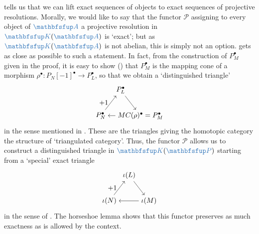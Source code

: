  tells us that we can lift exact sequences of
objects to exact sequences of projective resolutions. Morally, we
would like to say that the functor $\mathscr{P}$ assigning to every
object of $\categ{A}$ a projective resolution in
$\categ{K}(\categ{A})$ is `exact'; but as $\categ{K}(\categ{A})$ is
not abelian, this is simply not an option. 
gets as close as possible to such a statement. In fact, from the
construction of $P_M^\bullet$ given in the proof, it is easy to show
() that
$P_M^\bullet$ is the mapping cone of a morphism
$\rho^\bullet : P_N[-1]^\bullet \to P_L^\bullet$, so that we obtain a
`distinguished triangle'
\[
  \begin{tikzpicture}[baseline=(current bounding box.center)]
    \node (L) at (1,1.3)
    {$P_L^\bullet$}; \node (N) at (0,0)
    {$P_N^\bullet$}; \node (M) at (2,0)
    {$MC(\rho)^\bullet =
      P_M^\bullet$}; \draw[->] (L) -- (M); \draw[->] (M) -- (N);
    \draw[->] (N) -- (L) node[midway, left] {$+1$};
  \end{tikzpicture}
\]
in the sense mentioned in
. These are the
triangles giving the homotopic category the structure of `triangulated
category'. Thus, the functor $\mathscr{P}$ allows us to construct a
distinguished triangle in $\categ{K}(\categ{P})$ starting from a
`special' exact triangle
\[
  \begin{tikzpicture}[baseline=(current bounding box.center)]
    \node (L) at (1,1.3)
    {$\iota(L)$}; \node (N) at (0,0)
    {$\iota(N)$}; \node (M) at (2,0)
    {$\iota(M)$}; \draw[->] (L) -- (M); \draw[->] (M) -- (N);
    \draw[->] (N) -- (L) node[midway, left] {$+1$};
  \end{tikzpicture}
\]
in the sense of . The horseshoe lemma
shows that this functor preserves as much exactness as is allowed by
the context.

